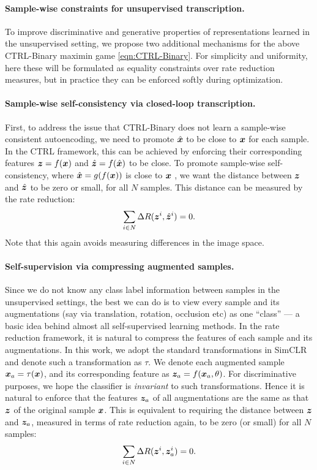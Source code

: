 \documentclass[../../book-main.tex]{subfiles}
\begin{document}
\paragraph{Sample-wise constraints for unsupervised transcription.} 
\label{sec:constraints}
To improve discriminative and generative properties of representations learned in the unsupervised setting, we propose two additional mechanisms for the above CTRL-Binary maximin game \eqref{eqn:CTRL-Binary}.  For simplicity and uniformity, here these will be formulated as equality constraints over rate reduction measures, but in practice they can be enforced softly during optimization.

\paragraph{Sample-wise self-consistency via closed-loop transcription.} 
First, to address the issue that CTRL-Binary does not learn a sample-wise consistent autoencoding, we need to promote $\hat {\bm{x}}$ to be close to $\bm{x}$ for each sample. In the CTRL framework, this can be achieved by enforcing their corresponding features $\bm{z}=f(\bm{x})$ and $\hat {\bm{z}} = f(\hat {\bm{x}})$ to be close. 
To promote sample-wise self-consistency, where $\hat{\bm{x}} = g(f(\bm{x}))$ is close to $\bm{x}$ , we want the distance between $\bm{z}$ and $\hat{\bm{z}}$ to be zero or small, for all $N$ samples.
This distance can be measured by the rate reduction:
\begin{align}
\sum_{i\in N} \Delta R(\z^i,\hat{\z}^i) = 0.
\label{eqn:sample-self-consistency}\vspace{-2mm}
\end{align}
Note that this again avoids measuring differences in the image space.

\paragraph{Self-supervision via compressing augmented samples.} 
Since we do not know any class label information between samples in the unsupervised settings, the best we can do is to view every sample and its augmentations (say via translation, rotation,  occlusion etc) as one ``class'' --- a basic idea behind almost all self-supervised learning methods. In the rate reduction framework, it is natural to compress the features of each sample and its augmentations. In this work, we adopt the standard transformations in SimCLR \cite{chen2020simple} and denote such a transformation as $\tau$. We denote each augmented sample $\bm{x}_a = \tau(\bm{x})$, and its corresponding feature as $\bm{z}_a = f(\bm{x}_a, \theta) $. For discriminative purposes, we hope the classifier is {\em invariant} to such transformations. Hence it is natural to enforce that the features $\bm{z}_a$ of all augmentations are the same as that $\bm{z}$ of the original sample $\bm{x}$. This is equivalent to requiring the distance between $\bm{z}$  and  $\bm{z}_a$, measured in terms of rate reduction again, to be zero (or small) for all $N$ samples: 
\begin{align}
\sum_{i\in N} \Delta R(\z^i,\z_{a}^i) = 0.
\label{eqn:sample-compression}\vspace{-3mm}
\end{align}
\end{document}
